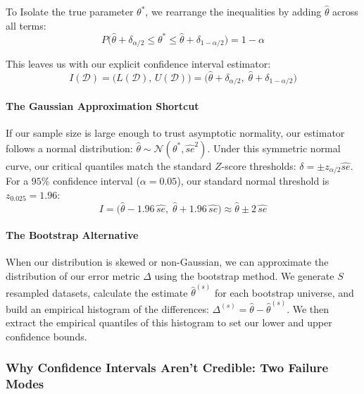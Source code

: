\documentclass{article}
\begin{document}
To Isolate the true parameter $\theta^*$, we rearrange the inequalities by adding $\hat{\theta}$ across all terms:
\begin{equation}
P\Big(\hat{\theta} + \delta_{\alpha/2} \le \theta^* \le \hat{\theta} + \delta_{1 - \alpha/2}\Big) = 1 - \alpha
\end{equation}

This leaves us with our explicit confidence interval estimator:
\begin{equation}
I(\mathcal{D}) = \Big(L(\mathcal{D}), \, U(\mathcal{D})\Big) = \Big(\hat{\theta} + \delta_{\alpha/2}, \; \hat{\theta} + \delta_{1 - \alpha/2}\Big)
\end{equation}

\paragraph{The Gaussian Approximation Shortcut}
If our sample size is large enough to trust asymptotic normality, our estimator follows a normal distribution: $\hat{\theta} \sim \mathcal{N}(\theta^*, \hat{se}^2)$. Under this symmetric normal curve, our critical quantiles match the standard $Z$-score thresholds: $\delta = \pm z_{\alpha/2}\hat{se}$. For a $95\%$ confidence interval ($\alpha = 0.05$), our standard normal threshold is $z_{0.025} = 1.96$:
\begin{equation}
I = \Big(\hat{\theta} - 1.96\,\hat{se}, \; \hat{\theta} + 1.96\,\hat{se}\Big) \approx \hat{\theta} \pm 2\,\hat{se}
\end{equation}

\paragraph{The Bootstrap Alternative}
When our distribution is skewed or non-Gaussian, we can approximate the distribution of our error metric $\Delta$ using the bootstrap method. We generate $S$ resampled datasets, calculate the estimate $\hat{\theta}^{(s)}$ for each bootstrap universe, and build an empirical histogram of the differences: $\Delta^{(s)} = \hat{\theta} - \hat{\theta}^{(s)}$. We then extract the empirical quantiles of this histogram to set our lower and upper confidence bounds.

\subsubsection{Why Confidence Intervals Aren't Credible: Two Failure Modes}
\end{document}
